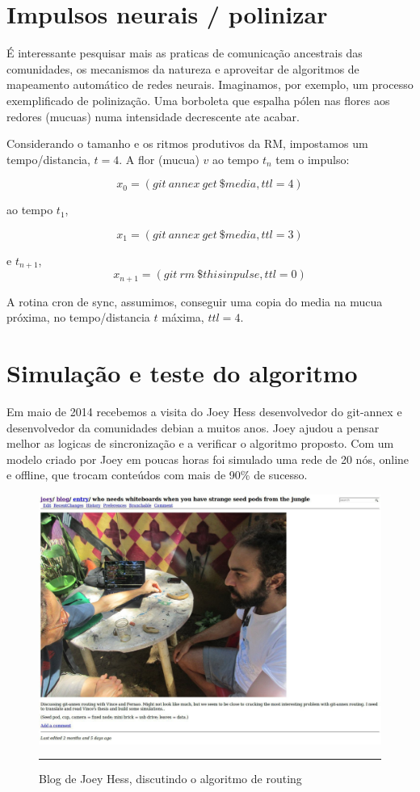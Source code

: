 \section{Impulsos neurais / polinizar}
É interessante pesquisar mais as praticas de comunicação ancestrais
das comunidades, os mecanismos da natureza e aproveitar de algoritmos
de mapeamento automático de redes neurais. Imaginamos, por exemplo, um
processo exemplificado de polinização. Uma borboleta que espalha pólen
nas flores aos redores (mucuas) numa intensidade decrescente ate
acabar.

Considerando o tamanho e os ritmos produtivos da RM, impostamos um
tempo/distancia, $t=4$. A flor (mucua) $v$ ao tempo $t_{n}$ tem o
impulso:

$$
x_0 = (git \ annex \ get \ \$media, ttl=4) 
$$

ao tempo $t_{1}$,

$$
x_1 = (git \ annex \ get \ \$media, ttl=3)
$$

e $t_{n+1}$,
$$
x_{n+1} = (git \ rm  \ \$thisinpulse, ttl=0)
$$

A rotina cron de sync, assumimos, conseguir uma copia do media na
mucua próxima, no tempo/distancia $t$ máxima, $ttl=4$.


\section{Simulação e teste do algoritmo}

Em maio de 2014 recebemos a visita do Joey Hess desenvolvedor do
git-annex e desenvolvedor da comunidades debian a muitos anos. Joey
ajudou a pensar melhor as logicas de sincronização e a verificar o
algoritmo proposto. Com um modelo criado por Joey em poucas horas foi
simulado uma rede de 20 nós, online e offline, que trocam conteúdos
com mais de 90\% de sucesso.

\begin{figure}[htbp]
  \centering
  \includegraphics[width=\textwidth]{./Fig/Joey_Blog_Seeds.pdf}
  \rule{35em}{0.5pt}
  \caption[Blog de Joey Hess, discutindo o algoritmo de routing]{Blog
    de Joey Hess, discutindo o algoritmo de routing}
  \label{fig:Joey_Blog_Seeds}
\end{figure}



